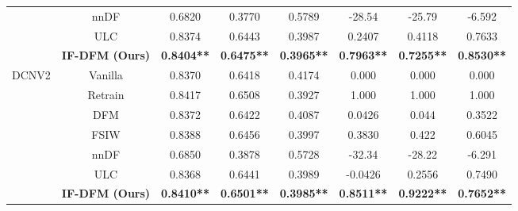 \begin{table*}[htbp]
\begin{tabular}{c|c|cccccc}
                         & {nnDF}    & 0.6820                     & 0.3770                       & 0.5789                    & -28.54                        & -25.79                          & -6.592          \\
                         & {ULC}     & 0.8374                     & 0.6443                       & 0.3987                    & 0.2407                        & 0.4118                          & 0.7633          \\
                         & \textbf{IF-DFM (Ours)}    & \textbf{0.8404**}            & \textbf{0.6475**}              & \textbf{0.3965**}           & \textbf{0.7963**}               & \textbf{0.7255**}                 & \textbf{0.8530**} \\ \midrule
\multirow{7}{*}{{DCNV2}}  & {Vanilla} & 0.8370                     & 0.6418                       & 0.4174                    & 0.000                         & 0.000                           & 0.000           \\
                         & {Retrain} & 0.8417                     & 0.6508                       & 0.3927                    & 1.000                         & 1.000                           & 1.000           \\ \cline{2-8} 
                         & {DFM}     & 0.8372                     & 0.6422                       & 0.4087                    & 0.0426                        & 0.044                           & 0.3522          \\
                         & {FSIW}    & 0.8388                     & 0.6456                       & 0.3997                    & 0.3830                        & 0.422                           & 0.6045          \\
                         & {nnDF}    & 0.6850                     & 0.3878                       & 0.5728                    & -32.34                        & -28.22                          & -6.291          \\
                         & {ULC}     & 0.8368                     & 0.6441                       & 0.3989                    & -0.0426                       & 0.2556                          & 0.7490          \\
                         & \textbf{IF-DFM (Ours)}    & \textbf{0.8410**}            & \textbf{0.6501**}              & \textbf{0.3985**}           & \textbf{0.8511**}               & \textbf{0.9222**}                 & \textbf{0.7652**}  \\ \bottomrule
\end{tabular}
\end{table*}

